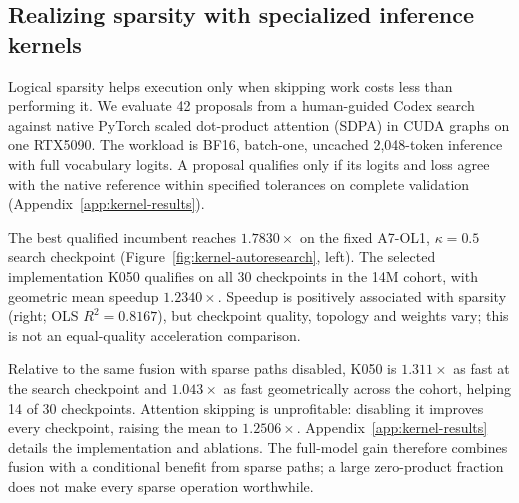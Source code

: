 \subsection{Realizing sparsity with specialized inference kernels}
\label{sec:kernel-autoresearch}

Logical sparsity helps execution only when skipping work costs less than
performing it. We evaluate 42 proposals from a human-guided Codex search
against native PyTorch scaled dot-product attention (SDPA) in CUDA graphs
on one RTX5090. The workload is BF16, batch-one, uncached 2,048-token
inference with full vocabulary logits. A proposal qualifies only if its
logits and loss agree with the native reference within specified tolerances
on complete validation (Appendix~\ref{app:kernel-results}).

The best qualified incumbent reaches $1.7830\times$ on the fixed A7-OL1,
$\kappa=0.5$ search checkpoint (Figure~\ref{fig:kernel-autoresearch}, left).
The selected implementation K050 qualifies on all 30 checkpoints in the
14M cohort, with geometric mean speedup $1.2340\times$. Speedup is positively
associated with sparsity (right; OLS $R^2=0.8167$), but checkpoint quality,
topology and weights vary; this is not an equal-quality acceleration comparison.

Relative to the same fusion with sparse paths disabled, K050 is
$1.311\times$ as fast at the search checkpoint and $1.043\times$ as fast
geometrically across the cohort, helping 14 of 30 checkpoints.
Attention skipping is unprofitable:
disabling it improves every checkpoint, raising the mean to $1.2506\times$.
Appendix~\ref{app:kernel-results} details the implementation and ablations.
The full-model gain therefore combines fusion with a conditional benefit
from sparse paths; a large zero-product fraction does not make every
sparse operation worthwhile.

